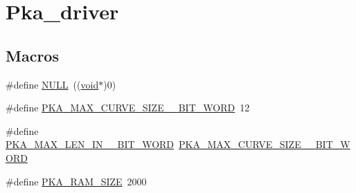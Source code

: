 \hypertarget{group__pka__driver}{}\section{Pka\+\_\+driver}
\label{group__pka__driver}
\subsection*{Macros}
\begin{DoxyCompactItemize}
\item 
\#define \hyperlink{group__pka__driver_ga070d2ce7b6bb7e5c05602aa8c308d0c4}{N\+U\+LL}~((\hyperlink{usb__devapi_8h_afabf60e7f57651d6d595a02c75f07cd0}{void}$\ast$)0)
\item 
\#define \hyperlink{group__pka__driver_ga4cb93e92891ad7120992f05616e0a77f}{P\+K\+A\+\_\+\+M\+A\+X\+\_\+\+C\+U\+R\+V\+E\+\_\+\+S\+I\+Z\+E\+\_\+\_\+\+B\+I\+T\+\_\+\+W\+O\+RD}~12
\item 
\#define \hyperlink{group__pka__driver_ga38ce8bc8a86da72caa13bc9476b9fc41}{P\+K\+A\+\_\+\+M\+A\+X\+\_\+\+L\+E\+N\+\_\+\+I\+N\+\_\+\_\+\+B\+I\+T\+\_\+\+W\+O\+RD}~\hyperlink{group__pka__driver_ga4cb93e92891ad7120992f05616e0a77f}{P\+K\+A\+\_\+\+M\+A\+X\+\_\+\+C\+U\+R\+V\+E\+\_\+\+S\+I\+Z\+E\+\_\+\_\+\+B\+I\+T\+\_\+\+W\+O\+RD}
\item 
\#define \hyperlink{group__pka__driver_ga587496a1c16227ec2861c0f5d8f786e9}{P\+K\+A\+\_\+\+R\+A\+M\+\_\+\+S\+I\+ZE}~2000
\end{DoxyCompactItemize}

